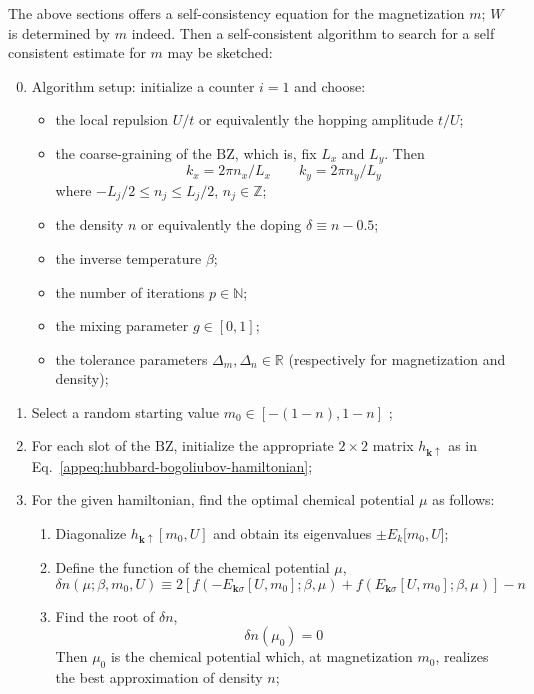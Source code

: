The above sections offers a self-consistency equation for the magnetization $m$; $W$ is determined by $m$ indeed. Then a self-consistent algorithm to search for a self consistent estimate for $m$ may be sketched:
\begin{enumerate}
	\setcounter{enumi}{-1}
	\item Algorithm setup: initialize a counter $i=1$ and choose:
	\begin{itemize}
		\item the local repulsion $U/t$ or equivalently the hopping amplitude $t/U$;
		\item the coarse-graining of the $\mathrm{BZ}$, which is, fix $L_x$ and $L_y$. Then 
		\[ 
			k_x = 2\pi n_x/L_x
			\qquad
			k_y = 2\pi n_y/L_y 
		\]
		where $-L_j/2 \le n_j \le L_j/2$, $n_j \in \mathbb{Z}$;
		\item the density $n$ or equivalently the doping $\delta \equiv n-0.5$;
		\item the inverse temperature $\beta$;
		\item the number of iterations $p \in \mathbb{N}$; 
		\item the mixing parameter $g \in [0,1]$;
		\item the tolerance parameters $\Delta_m, \Delta_n \in \mathbb{R}$ (respectively for magnetization and density);
	\end{itemize}
	\item {\color{tabred}
		Select a random starting value $m_0 \in [-(1-n),1-n]$
	};
	\item For each slot of the $\mathrm{BZ}$, initialize the appropriate $2\times2$ matrix $h_{\mathbf{k}\uparrow}$ as in Eq.~\eqref{appeq:hubbard-bogoliubov-hamiltonian};
	\item For the given hamiltonian, find the optimal chemical potential $\mu$ as follows:
	\begin{enumerate}
		\item Diagonalize $h_{\mathbf{k}\uparrow}[m_0, U]$ and obtain its eigenvalues $\pm E_k[m_0, U$]; 
		\item Define the function of the chemical potential $\mu$,
		\[
			\delta n(\mu; \beta, m_0, U) \equiv 2 \left[
			f\left(-E_{\mathbf{k}\sigma}[U,m_0]; \beta,\mu \right) + f \left( E_{\mathbf{k}\sigma}[U,m_0]; \beta,\mu \right)
			\right] - n
		\]
		\item Find the root of $\delta n$, 
		\[
			\delta n(\mu_0) = 0
		\]
		Then $\mu_0$ is the chemical potential which, at magnetization $m_0$, realizes the best approximation of density $n$;
	\end{enumerate}

\end{enumerate}
